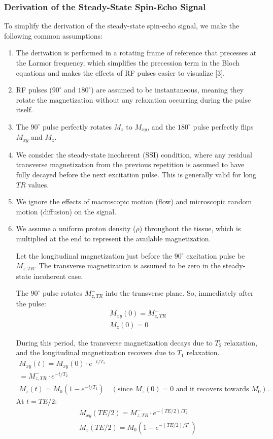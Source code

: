 \documentclass[10pt,a4paper,twoside]{article}
\begin{document}
\subsubsection{Derivation of the Steady-State Spin-Echo Signal}
To simplify the derivation of the steady-state spin-echo signal, we make the following common assumptions:
\begin{enumerate}
    \item The derivation is performed in a rotating frame of reference that precesses at the Larmor frequency, which simplifies the precession term in the Bloch equations and makes the effects of RF pulses easier to visualize [3].
    \item RF pulses ($90^\circ$ and $180^\circ$) are assumed to be instantaneous, meaning they rotate the magnetization without any relaxation occurring during the pulse itself.
    \item The $90^\circ$ pulse perfectly rotates $M_z$ to $M_{xy}$, and the $180^\circ$ pulse perfectly flips $M_{xy}$ and $M_z$.
    \item We consider the steady-state incoherent (SSI) condition, where any residual transverse magnetization from the previous repetition is assumed to have fully decayed before the next excitation pulse. This is generally valid for long $TR$ values.
    \item We ignore the effects of macroscopic motion (flow) and microscopic random motion (diffusion) on the signal.
    \item We assume a uniform proton density ($\rho$) throughout the tissue, which is multiplied at the end to represent the available magnetization.

\vspace{12pt}

Let the longitudinal magnetization just before the $90^\circ$ excitation pulse be $M_{z,TR}^-$. The transverse magnetization is assumed to be zero in the steady-state incoherent case.

\vspace{12pt}

The $90^\circ$ pulse rotates $M_{z,TR}^-$ into the transverse plane. So, immediately after the pulse:
\begin{gather*}
M_{xy}(0) = M_{z,TR}^- \\
M_z(0) = 0
\end{gather*}

\vspace{12pt}

During this period, the transverse magnetization decays due to $T_2$ relaxation, and the longitudinal magnetization recovers due to $T_1$ relaxation.
\begin{gather*}
M_{xy}(t) = M_{xy}(0) \cdot e^{-t/T_2} \\
= M_{z,TR}^- \cdot e^{-t/T_2} \\
M_z(t) = M_0(1 - e^{-t/T_1}) \quad (\text{since } M_z(0)=0 \text{ and it recovers towards } M_0).
\end{gather*}
At $t=TE/2$:
\begin{gather*}
M_{xy}(TE/2) = M_{z,TR}^- \cdot e^{-(TE/2)/T_2} \\
M_z(TE/2) = M_0(1 - e^{-(TE/2)/T_1})
\end{gather*}


\end{enumerate}
\end{document}
